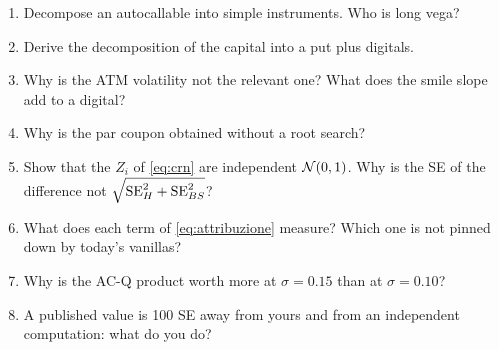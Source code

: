 \begin{domande}[before skip=6pt plus 8pt]
\begin{enumerate}
\item Decompose an autocallable into simple instruments. Who is long vega?
\item Derive the decomposition of the capital into a put plus digitals.
\item Why is the ATM volatility not the relevant one? What does the smile slope add to a digital?
\item Why is the par coupon obtained without a root search?
\item Show that the $Z_i$ of \eqref{eq:crn} are independent $\mathcal{N}(0,1)$. Why is the SE of the difference not
$\sqrt{\mathrm{SE}_H^2+\mathrm{SE}_{BS}^2}$?
\item What does each term of \eqref{eq:attribuzione} measure? Which one is not pinned down by today's vanillas?
\item Why is the \mbox{AC-Q} product worth more at $\sigma=0.15$ than at $\sigma=0.10$?
\item A published value is 100 SE away from yours and from an independent computation: what do you do?
\end{enumerate}
\end{domande}
